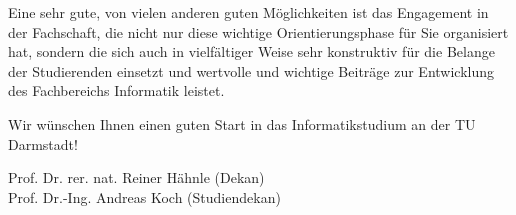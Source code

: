 {Eine sehr gute, von vielen anderen guten Möglichkeiten ist das Engagement in der Fachschaft, die nicht nur diese wichtige Orientierungsphase für Sie organisiert hat, sondern die sich auch in vielfältiger Weise sehr konstruktiv für die Belange der Studierenden einsetzt und wertvolle und wichtige Beiträge zur Entwicklung des Fachbereichs Informatik leistet.

Wir wünschen Ihnen einen guten Start in das Informatikstudium an der TU Darmstadt!
}
{Prof. Dr. rer. nat. Reiner Hähnle (Dekan) \\Prof. Dr.-Ing. Andreas Koch (Studiendekan)}

\newpage